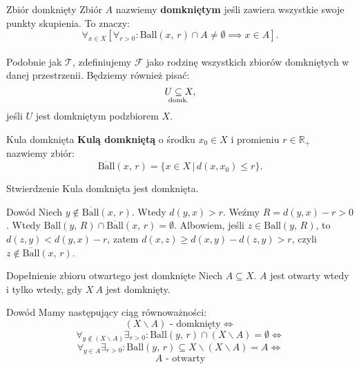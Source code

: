 \documentclass{article}
\newcommand{\R}{\mathbb{R}}
\newcommand{\Tau}{\mathcal{T}}
\newcommand{\Fau}{\mathcal{F}}
\newcommand{\subdomk}{\underset{\clap{\scriptsize domk.}}{\subseteq}}
\newcommand{\ball}[2]{\text{Ball}(#1, \, #2)}
\newcommand{\dball}[2]{\overline{\text{Ball}}(#1, \, #2)}
\begin{document}
     \begin{defr}{Zbiór domknięty}
        Zbiór $A$ nazwiemy \textbf{domkniętym} jeśli zawiera wszystkie swoje punkty skupienia. To znaczy: \begin{equation}
            \forall_{x \in X} [\forall_{r>0}: \ball{x}{r} \cap A \neq \emptyset \implies x \in A]. 
        \end{equation}
        \\
        Podobnie jak $\Tau$, zdefiniujemy $\Fau$ jako rodzinę wszystkich zbiorów domkniętych w danej przestrzenii. Będziemy również pisać:
        \begin{equation}
            U \subdomk X,
        \end{equation}
        jeśli $U$ jest domkniętym podzbiorem $X$.
    \end{defr}

    \begin{defr}{Kula domknięta}
        \textbf{Kulą domkniętą} o środku $x_0 \in X$ i promieniu $r \in \R_+$ nazwiemy zbiór: \begin{equation}
            \dball{x}{r} = \{ x\in X \, | \, d(x, x_0) \leqslant r\}.
        \end{equation}
    \end{defr}

    \begin{twier}{Stwierdzenie}
        Kula domknięta jest domknięta.
     \end{twier}

     \begin{dow}{Dowód}
        Niech $y \notin \dball{x}{r}$. Wtedy $d(y, x) > r$. Weźmy $R = d(y, x) - r > 0$. Wtedy $\ball{y}{R} \cap \dball{x}{r} = \emptyset$. Albowiem, jeśli $z \in \ball{y}{R}$, to $d(z, y) <  d(y, x) - r $, zatem $d(x, z) \geqslant d(x, y) - d(z, y)  > r$, czyli $z \notin \dball{x}{r}$.
     \end{dow}

     \begin{twier}{Dopełnienie zbioru otwartego jest domknięte}
        Niech $A \subseteq X$. $A$ jest otwarty wtedy i tylko wtedy, gdy $X \ A$ jest domknięty.
     \end{twier}

     \begin{dow}{Dowód}
        Mamy następujący ciąg równoważności:
        \begin{equation}
            (X \backslash A) \text{ - domknięty} \iff
        \end{equation}
        \begin{equation}
            \forall_{y \notin (X \backslash A)} \exists_{r > 0}: \ball{y}{r} \cap (X \backslash A) =  \emptyset \iff
        \end{equation}
        \begin{equation}
            \forall_{y \in A} \exists_{r > 0}: \ball{y}{r} \subseteq X \backslash (X \backslash A) = A \iff
        \end{equation}
        \begin{equation}
            A \text{ - otwarty} 
        \end{equation}
     \end{dow}
\end{document}
